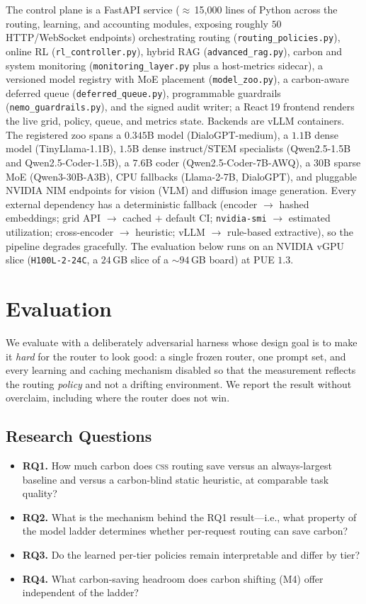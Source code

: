 \documentclass[10pt,twocolumn]{article}
\newcommand{\css}{\textsc{css}}
\begin{document}
The control plane is a FastAPI service ($\approx$\,15{,}000 lines of Python
across the routing, learning, and accounting modules, exposing roughly $50$
HTTP/WebSocket endpoints) orchestrating routing
(\texttt{routing\_policies.py}), online RL (\texttt{rl\_controller.py}), hybrid
RAG (\texttt{advanced\_rag.py}), carbon and system monitoring
(\texttt{monitoring\_layer.py} plus a host-metrics sidecar), a versioned model
registry with MoE placement (\texttt{model\_zoo.py}), a carbon-aware deferred
queue (\texttt{deferred\_queue.py}), programmable guardrails
(\texttt{nemo\_guardrails.py}), and the signed audit writer; a React\,19
frontend renders the live grid, policy, queue, and metrics state. Backends are
vLLM containers. The registered zoo spans a $0.345$B model
(DialoGPT-medium), a $1.1$B dense model (TinyLlama-1.1B), $1.5$B dense
instruct/STEM specialists (Qwen2.5-1.5B and Qwen2.5-Coder-1.5B), a $7.6$B coder
(Qwen2.5-Coder-7B-AWQ), a $30$B sparse MoE (Qwen3-30B-A3B), CPU fallbacks
(Llama-2-7B, DialoGPT), and pluggable NVIDIA NIM endpoints for vision (VLM) and
diffusion image generation. Every external dependency has a deterministic
fallback (encoder $\to$ hashed embeddings; grid API $\to$ cached $+$ default CI;
\texttt{nvidia-smi} $\to$ estimated utilization; cross-encoder $\to$ heuristic;
vLLM $\to$ rule-based extractive), so the pipeline degrades gracefully. The
evaluation below runs on an NVIDIA vGPU slice (\texttt{H100L-2-24C}, a $24$\,GB
slice of a $\sim$$94$\,GB board) at PUE $1.3$.

\section{Evaluation}
\label{sec:eval}

We evaluate with a deliberately adversarial harness whose design goal is to
make it \emph{hard} for the router to look good: a single frozen router, one
prompt set, and every learning and caching mechanism disabled so that the
measurement reflects the routing \emph{policy} and not a drifting environment.
We report the result without overclaim, including where the router does not win.

\subsection{Research Questions}
\begin{itemize}
  \item \textbf{RQ1.} How much carbon does \css{} routing save versus an
        always-largest baseline and versus a carbon-blind static heuristic, at
        comparable task quality?
  \item \textbf{RQ2.} What is the mechanism behind the RQ1 result---i.e., what
        property of the model ladder determines whether per-request routing can
        save carbon?
  \item \textbf{RQ3.} Do the learned per-tier policies remain interpretable and
        differ by tier?
  \item \textbf{RQ4.} What carbon-saving headroom does carbon shifting (M4)
        offer independent of the ladder?
\end{itemize}
\end{document}
